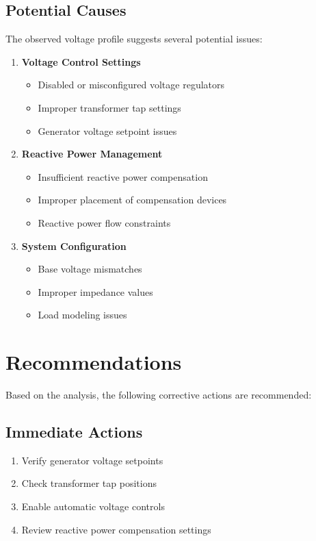 \documentclass[11pt]{article}
\begin{document}
\subsection{Potential Causes}
The observed voltage profile suggests several potential issues:
\begin{enumerate}
    \item \textbf{Voltage Control Settings}
    \begin{itemize}
        \item Disabled or misconfigured voltage regulators
        \item Improper transformer tap settings
        \item Generator voltage setpoint issues
    \end{itemize}
    
    \item \textbf{Reactive Power Management}
    \begin{itemize}
        \item Insufficient reactive power compensation
        \item Improper placement of compensation devices
        \item Reactive power flow constraints
    \end{itemize}
    
    \item \textbf{System Configuration}
    \begin{itemize}
        \item Base voltage mismatches
        \item Improper impedance values
        \item Load modeling issues
    \end{itemize}
\end{enumerate}

\section{Recommendations}
Based on the analysis, the following corrective actions are recommended:

\subsection{Immediate Actions}
\begin{enumerate}
    \item Verify generator voltage setpoints
    \item Check transformer tap positions
    \item Enable automatic voltage controls
    \item Review reactive power compensation settings
\end{enumerate}
\end{document}
